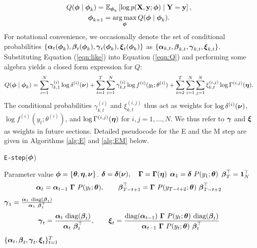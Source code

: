 \begin{gather}
    Q(\boldsymbol{\phi} \mid \boldsymbol{\phi}_{k}) = \mathbb{E}_{\boldsymbol{\phi}_{k}}\left[\log p(\mathbf{X},\mathbf{y};\boldsymbol{\phi}) \mid \mathbf{Y} = \mathbf{y} \right] \label{eqn:Q}, \\
    \boldsymbol{\phi}_{k+1} = \operatorname*{arg\,max}_{\boldsymbol{\phi}} Q(\boldsymbol{\phi} \mid \boldsymbol{\phi}_{k}). \label{eqn:BW_update}
\end{gather}
%
For notational convenience, we occasionally denote the set of conditional probabilities $\{\boldsymbol{\alpha}_t(\boldsymbol{\phi}_k), \boldsymbol{\beta}_t(\boldsymbol{\phi}_k), \boldsymbol{\gamma}_t(\boldsymbol{\phi}_k), \boldsymbol{\xi}_t(\boldsymbol{\phi}_k)\}$ as $\{\boldsymbol{\alpha}_{k,t},\boldsymbol{\beta}_{k,t},\boldsymbol{\gamma}_{k,t},\boldsymbol{\xi}_{k,t}\}$. Substituting Equation (\ref{eqn:like}) into Equation (\ref{eqn:Q}) and performing some algebra yields a closed form expression for $Q$: 
%
\begin{equation}
    Q(\boldsymbol{\phi} \mid \boldsymbol{\phi}_{k}) = \sum_{i=1}^N \gamma^{(i)}_{k,1} \log \delta^{(i)}(\boldsymbol{\nu}) + \sum_{t = 1}^T \sum_{i=1}^N \gamma^{(i)}_{k,t} \log f^{(i)}(y_t;\theta^{(i)}) + \sum_{t=2}^{T} \sum_{i=1}^N \sum_{j=1}^N \xi^{(i,j)}_{k,t} \log \Gamma^{(i,j)}(\boldsymbol{\eta}).
    \label{eqn:Q_sum}
\end{equation}
%
The conditional probabilities $\gamma_{k,t}^{(i)}$ and $\xi_{k,t}^{(i,j)}$ thus act as weights for $\log \delta^{(i)}(\boldsymbol{\nu})$, $\log f^{(i)}(y_t;\theta^{(i)})$, and $\log \Gamma^{(i,j)}(\boldsymbol{\eta})$ for $i,j = 1,\ldots,N$. We thus refer to $\boldsymbol{\gamma}$ and $\boldsymbol{\xi}$ as weights in future sections. Detailed pseudocode for the E and the M step are given in Algorithms \ref{alg:E} and \ref{alg:EM} below.
%
\begin{algorithm}
\caption{\texttt{E-step}($\boldsymbol{\phi}$)}\label{alg:E}
\begin{algorithmic}[1]
\Require Parameter value $\boldsymbol{\phi} = \{\boldsymbol{\theta},\boldsymbol{\eta},\boldsymbol{\nu}\}$.
%
\State $\boldsymbol{\delta} = \boldsymbol{\delta}(\boldsymbol{\nu}), \quad \boldsymbol{\Gamma} = \boldsymbol{\Gamma}(\boldsymbol{\eta})$
\State $\boldsymbol{\alpha}_1 = \boldsymbol{\delta} ~ P(y_1;\boldsymbol{\theta})$
\State $\boldsymbol{\beta}^\top_T = \mathbf{1}_N^\top$
    \State $$\boldsymbol{\alpha}_t = \boldsymbol{\alpha}_{t-1} ~ \boldsymbol{\Gamma} ~ P(y_t;\boldsymbol{\theta}), \qquad \boldsymbol{\beta}^\top_{T-t+1} = \boldsymbol{\Gamma} ~ P(y_{T-t+2};\boldsymbol{\theta}) ~ \boldsymbol{\beta}^\top_{T-t+2}$$
\EndFor
%
\State $\boldsymbol{\gamma}_1 = \frac{\boldsymbol{\alpha}_1 ~ \text{diag}(\boldsymbol{\beta}_1)}{\boldsymbol{\alpha}_1 ~ \boldsymbol{\beta}_1^\top}$
%
    \State $$\boldsymbol{\gamma}_t = \frac{\boldsymbol{\alpha}_t ~ \text{diag}(\boldsymbol{\beta}_t)}{\boldsymbol{\alpha}_t ~ \boldsymbol{\beta}_t^\top}, \qquad \boldsymbol{\xi}_t = \frac{\text{diag}(\boldsymbol{\alpha}_{t-1}) ~ \boldsymbol{\Gamma} ~ P(y_t;\boldsymbol{\theta}) ~ \text{diag}(\boldsymbol{\beta}_t)}{\boldsymbol{\alpha}_{t-1} ~ \boldsymbol{\Gamma} ~ P(y_{t};\boldsymbol{\theta}) ~ \boldsymbol{\beta}_{t}^\top}$$
\EndFor
%
\State \Return $\{\boldsymbol{\alpha}_t,\boldsymbol{\beta}_t,\boldsymbol{\gamma}_t,\boldsymbol{\xi}_t\}_{t=1}^T$
\end{algorithmic}
\end{algorithm}
